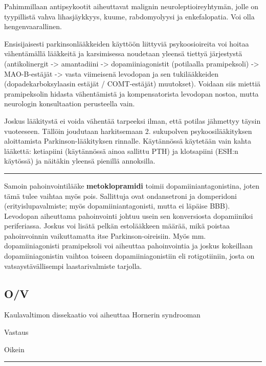 \documentclass[
]{book}
\begin{document}
Pahimmillaan antipsykootit aiheuttavat malignin neuroleptioireyhtymän, jolle on tyypillistä vahva lihasjäykkyys, kuume, rabdomyolyysi ja enkefalopatia. Voi olla hengenvaarallinen.

Ensisijaisesti parkinsonlääkkeiden käyttöön liittyviä psykoosioireita voi hoitaa vähentämällä lääkkeitä ja karsimisessa noudetaan yleensä tiettyä järjestystä (antikolinergit -\textgreater{} amantadiini -\textgreater{} dopamiiniagonistit (potilaalla pramipeksoli) -\textgreater{} MAO-B-estäjät -\textgreater{} vasta viimeisenä levodopan ja sen tukilääkkeiden (dopadekarboksylaasin estäjät / COMT-estäjät) muutokset). Voidaan siis miettiä pramipeksolin hidasta vähentämistä ja kompensatorista levodopan nostoa, mutta neurologin konsultaation perusteella vain.

Joskus lääkitystä ei voida vähentää tarpeeksi ilman, että potilas jähmettyy täysin vuoteeseen. Tällöin joudutaan harkitsemaan 2. sukupolven psykoosilääkityksen aloittamista Parkinson-lääkityksen rinnalle. Käytännössä käytetään vain kahta lääkettä: ketiapiini (käytännössä ainoa sallittu PTH) ja klotsapiini (ESH:n käytössä) ja näitäkin yleensä pienillä annoksilla.

\begin{center}\rule{0.5\linewidth}{0.5pt}\end{center}

Samoin pahoinvointilääke \textbf{metoklopramidi} toimii dopamiiniantagonistina, joten tämä tulee vaihtaa myös pois. Sallittuja ovat ondansetroni ja domperidoni (erityislupavalmiste; myös dopamiiniantagonisti, mutta ei läpäise BBB). Levodopan aiheuttama pahoinvointi johtuu usein sen konversiosta dopamiiniksi periferiassa. Joskus voi lisätä pelkän estolääkkeen määrää, mikä poistaa pahoinvoinnin vaikuttamatta itse Parkinson-oireisiin. Myös mm. dopamiiniagonisti pramipeksoli voi aiheuttaa pahoinvointia ja joskus kokeillaan dopamiiniagonistin vaihtoa toiseen dopamiiniagonistiin eli rotigotiiniin, josta on vatsaystävällisempi laastarivalmiste tarjolla.

\subsection{O/V}\label{ov-22}

Kaulavaltimon dissekaatio voi aiheuttaa Hornerin syndrooman

Vastaus

Oikein

\begin{center}\rule{0.5\linewidth}{0.5pt}\end{center}
\end{document}
